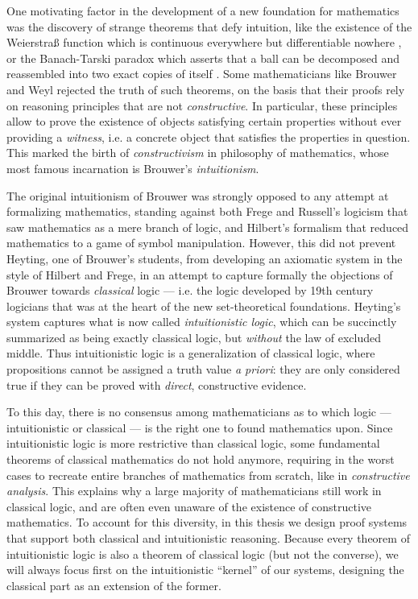 One motivating factor in the development of a new foundation for mathematics was
the discovery of strange theorems that defy intuition, like the existence of the
Weierstra{\ss} function which is continuous everywhere but differentiable
nowhere , or the Banach-Tarski paradox which
asserts that a ball can be decomposed and reassembled into two exact copies of
itself . Some mathematicians like Brouwer and Weyl
rejected the truth of such theorems, on the basis that their proofs rely on
reasoning principles that are not \emph{constructive}. In particular, these principles
allow to prove the existence of objects satisfying certain properties without
ever providing a \emph{witness}, i.e. a concrete object that satisfies the
properties in question. This marked the birth of \emph{constructivism} in
philosophy of mathematics, whose most famous incarnation is Brouwer's
\emph{intuitionism}.

The original intuitionism of Brouwer was strongly opposed to any attempt at
formalizing mathematics, standing against both Frege and Russell's logicism that
saw mathematics as a mere branch of logic, and Hilbert's formalism that reduced
mathematics to a game of symbol manipulation. However, this did not prevent
Heyting, one of Brouwer's students, from developing an axiomatic system in the
style of Hilbert and Frege, in an attempt to capture formally the objections of
Brouwer towards \emph{classical} logic --- i.e. the logic developed by 19th
century logicians that was at the heart of the new set-theoretical foundations.
Heyting's system captures what is now called \emph{intuitionistic logic}, which
can be succinctly summarized as being exactly classical logic, but
\emph{without} the law of excluded middle. Thus intuitionistic logic is a
generalization of classical logic, where propositions cannot be assigned a truth
value \emph{a priori}: they are only considered true if they can be proved with
\emph{direct}, constructive evidence.

To this day, there is no consensus among mathematicians as to which logic ---
intuitionistic or classical --- is the right one to found mathematics upon.
Since intuitionistic logic is more restrictive than classical logic, some
fundamental theorems of classical mathematics do not hold anymore, requiring in
the worst cases to recreate entire branches of mathematics from scratch, like in
\emph{constructive analysis}. This explains why a large majority of
mathematicians still work in classical logic, and are often even unaware of the
existence of constructive mathematics. To account for this diversity, in this
thesis we design proof systems that support both classical and intuitionistic
reasoning. Because every theorem of intuitionistic logic is also a theorem of
classical logic (but not the converse), we will always focus first on the
intuitionistic ``kernel'' of our systems, designing the classical part as an
extension of the former.

